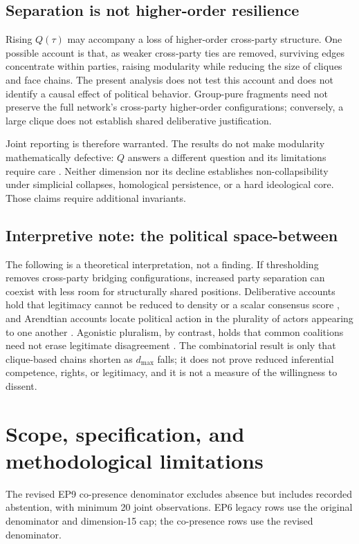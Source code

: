 \documentclass[a4paper,fleqn,oneside]{cas-sc}
\theoremstyle{definition}
\theoremstyle{plain}
\begin{document}
\subsection{Separation is not higher-order resilience}
Rising $Q(\tau)$ may accompany a loss of higher-order cross-party structure. One possible account is that, as weaker cross-party ties are removed, surviving edges concentrate within parties, raising modularity while reducing the size of cliques and face chains. The present analysis does not test this account and does not identify a causal effect of political behavior. Group-pure fragments need not preserve the full network's cross-party higher-order configurations; conversely, a large clique does not establish shared deliberative justification.

Joint reporting is therefore warranted. The results do not make modularity mathematically defective: $Q$ answers a different question and its limitations require care \citep{Fortunato2010}. Neither dimension nor its decline establishes non-collapsibility under simplicial collapses, homological persistence, or a hard ideological core. Those claims require additional invariants.
\subsection{Interpretive note: the political space-between}\label{subsec:political}
The following is a theoretical interpretation, not a finding. If thresholding removes cross-party bridging configurations, increased party separation can coexist with less room for structurally shared positions. Deliberative accounts hold that legitimacy cannot be reduced to density or a scalar consensus score \citep{Habermas1996}, and Arendtian accounts locate political action in the plurality of actors appearing to one another \citep{Arendt1958HumanCondition}. Agonistic pluralism, by contrast, holds that common coalitions need not erase legitimate disagreement \citep{Mouffe2000,Mouffe2013}. The combinatorial result is only that clique-based chains shorten as $d_{\max}$ falls; it does not prove reduced inferential competence, rights, or legitimacy, and it is not a measure of the willingness to dissent.
\section{Scope, specification, and methodological limitations}\label{sec:limitations}
The revised EP9 co-presence denominator excludes absence but includes recorded abstention, with minimum 20 joint observations. EP6 legacy rows use the original denominator and dimension-15 cap; the co-presence rows use the revised denominator.
\end{document}
